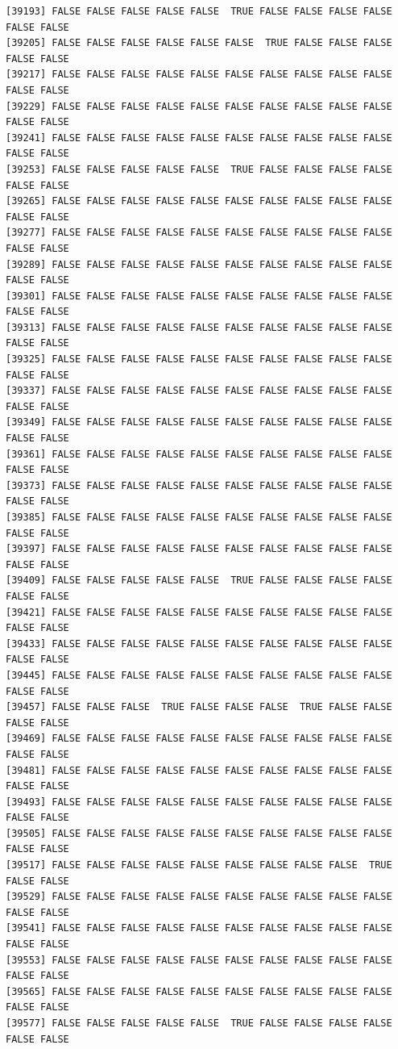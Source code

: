 \documentclass[
  a4paper,
  DIV=11,
  numbers=noendperiod]{scrartcl}
\begin{document}
\begin{verbatim}
[39193] FALSE FALSE FALSE FALSE FALSE  TRUE FALSE FALSE FALSE FALSE FALSE FALSE
[39205] FALSE FALSE FALSE FALSE FALSE FALSE  TRUE FALSE FALSE FALSE FALSE FALSE
[39217] FALSE FALSE FALSE FALSE FALSE FALSE FALSE FALSE FALSE FALSE FALSE FALSE
[39229] FALSE FALSE FALSE FALSE FALSE FALSE FALSE FALSE FALSE FALSE FALSE FALSE
[39241] FALSE FALSE FALSE FALSE FALSE FALSE FALSE FALSE FALSE FALSE FALSE FALSE
[39253] FALSE FALSE FALSE FALSE FALSE  TRUE FALSE FALSE FALSE FALSE FALSE FALSE
[39265] FALSE FALSE FALSE FALSE FALSE FALSE FALSE FALSE FALSE FALSE FALSE FALSE
[39277] FALSE FALSE FALSE FALSE FALSE FALSE FALSE FALSE FALSE FALSE FALSE FALSE
[39289] FALSE FALSE FALSE FALSE FALSE FALSE FALSE FALSE FALSE FALSE FALSE FALSE
[39301] FALSE FALSE FALSE FALSE FALSE FALSE FALSE FALSE FALSE FALSE FALSE FALSE
[39313] FALSE FALSE FALSE FALSE FALSE FALSE FALSE FALSE FALSE FALSE FALSE FALSE
[39325] FALSE FALSE FALSE FALSE FALSE FALSE FALSE FALSE FALSE FALSE FALSE FALSE
[39337] FALSE FALSE FALSE FALSE FALSE FALSE FALSE FALSE FALSE FALSE FALSE FALSE
[39349] FALSE FALSE FALSE FALSE FALSE FALSE FALSE FALSE FALSE FALSE FALSE FALSE
[39361] FALSE FALSE FALSE FALSE FALSE FALSE FALSE FALSE FALSE FALSE FALSE FALSE
[39373] FALSE FALSE FALSE FALSE FALSE FALSE FALSE FALSE FALSE FALSE FALSE FALSE
[39385] FALSE FALSE FALSE FALSE FALSE FALSE FALSE FALSE FALSE FALSE FALSE FALSE
[39397] FALSE FALSE FALSE FALSE FALSE FALSE FALSE FALSE FALSE FALSE FALSE FALSE
[39409] FALSE FALSE FALSE FALSE FALSE  TRUE FALSE FALSE FALSE FALSE FALSE FALSE
[39421] FALSE FALSE FALSE FALSE FALSE FALSE FALSE FALSE FALSE FALSE FALSE FALSE
[39433] FALSE FALSE FALSE FALSE FALSE FALSE FALSE FALSE FALSE FALSE FALSE FALSE
[39445] FALSE FALSE FALSE FALSE FALSE FALSE FALSE FALSE FALSE FALSE FALSE FALSE
[39457] FALSE FALSE FALSE  TRUE FALSE FALSE FALSE  TRUE FALSE FALSE FALSE FALSE
[39469] FALSE FALSE FALSE FALSE FALSE FALSE FALSE FALSE FALSE FALSE FALSE FALSE
[39481] FALSE FALSE FALSE FALSE FALSE FALSE FALSE FALSE FALSE FALSE FALSE FALSE
[39493] FALSE FALSE FALSE FALSE FALSE FALSE FALSE FALSE FALSE FALSE FALSE FALSE
[39505] FALSE FALSE FALSE FALSE FALSE FALSE FALSE FALSE FALSE FALSE FALSE FALSE
[39517] FALSE FALSE FALSE FALSE FALSE FALSE FALSE FALSE FALSE  TRUE FALSE FALSE
[39529] FALSE FALSE FALSE FALSE FALSE FALSE FALSE FALSE FALSE FALSE FALSE FALSE
[39541] FALSE FALSE FALSE FALSE FALSE FALSE FALSE FALSE FALSE FALSE FALSE FALSE
[39553] FALSE FALSE FALSE FALSE FALSE FALSE FALSE FALSE FALSE FALSE FALSE FALSE
[39565] FALSE FALSE FALSE FALSE FALSE FALSE FALSE FALSE FALSE FALSE FALSE FALSE
[39577] FALSE FALSE FALSE FALSE FALSE  TRUE FALSE FALSE FALSE FALSE FALSE FALSE

\end{verbatim}
\end{document}
